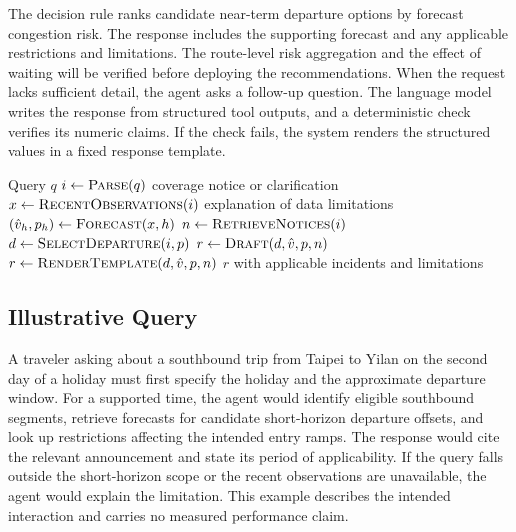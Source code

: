 The decision rule ranks candidate near-term departure options by forecast congestion risk. The response includes the supporting forecast and any applicable restrictions and limitations. The route-level risk aggregation and the effect of waiting will be verified before deploying the recommendations. When the request lacks sufficient detail, the agent asks a follow-up question. The language model writes the response from structured tool outputs, and a deterministic check verifies its numeric claims. If the check fails, the system renders the structured values in a fixed response template.

\begin{algorithm}[t]
\caption{Generate a departure advisory}
\label{alg:advice}
\begin{algorithmic}[1]
\Require Query \(q\)
\State \(i \gets \Call{Parse}{q}\)
  \State \Return coverage notice or clarification
\EndIf
\State \(x \gets \Call{RecentObservations}{i}\)
  \State \Return explanation of data limitations
\EndIf
{}
  \State \((\hat v_h,p_h) \gets \Call{Forecast}{x,h}\)
\EndFor
\State \(n \gets \Call{RetrieveNotices}{i}\)
\State \(d \gets \Call{SelectDeparture}{i,p}\)
\State \(r \gets \Call{Draft}{d,\hat v,p,n}\)
  \State \(r \gets \Call{RenderTemplate}{d,\hat v,p,n}\)
\EndIf
\State \Return \(r\) with applicable incidents and limitations
\end{algorithmic}
\end{algorithm}


\subsection{Illustrative Query}
A traveler asking about a southbound trip from Taipei to Yilan on the second day of a holiday must first specify the holiday and the approximate departure window. For a supported time, the agent would identify eligible southbound segments, retrieve forecasts for candidate short-horizon departure offsets, and look up restrictions affecting the intended entry ramps. The response would cite the relevant announcement and state its period of applicability. If the query falls outside the short-horizon scope or the recent observations are unavailable, the agent would explain the limitation. This example describes the intended interaction and carries no measured performance claim.
